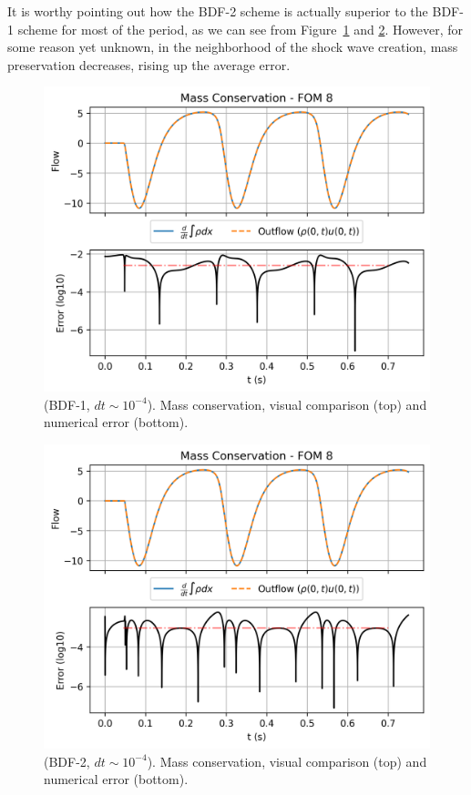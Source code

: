 \documentclass[../../thesis.tex]{subfiles}
\begin{document}
It is worthy pointing out how the BDF-2 scheme is actually superior to the BDF-1 scheme 
for most of the period, as we can see from Figure~\ref{fig:bdf_1_mass_plot} and \ref{fig:bdf_2_mass_plot}. 
However, for some reason yet unknown, in the neighborhood of the shock wave creation, mass preservation decreases,
rising up the average error.  
\begin{figure}[h]
    \centering
    \includegraphics[width=1\columnwidth]{research_project/piston/figures/bdf_convergence/mass_FOM_8_bdf_1.png}
    \caption{(BDF-1, $dt\sim 10^{-4}$).
    Mass conservation, visual comparison (top) and numerical error (bottom).}
    \label{fig:bdf_1_mass_plot}
\end{figure}
\begin{figure}[h]
    \centering
    \includegraphics[width=1\columnwidth]{research_project/piston/figures/bdf_convergence/mass_FOM_8_bdf_2.png}
    \caption{(BDF-2, $dt\sim 10^{-4}$).
    Mass conservation, visual comparison (top) and numerical error (bottom).}    \label{fig:bdf_2_mass_plot}
\end{figure}
\end{document}
